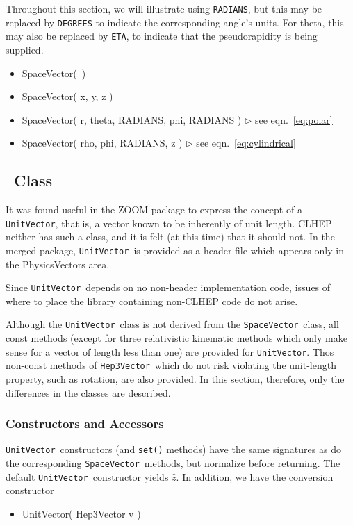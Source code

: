 \documentclass[twoside,12pt]{article}
\def \SV {{\tt Hep3Vector}}
\def \SVz {{\tt SpaceVector}}
\def \UV {{\tt UnitVector}}
\newcommand {\see}[1] {\hfill$\triangleright$ see eqn.~#1}
\newenvironment{shortlist}{%
\begin{itemize}
\setlength{\itemsep}{0pt}
\setlength{\parskip}{0pt}
}{%
\end{itemize}
}
\begin{document}
Throughout this section, we will illustrate using {\tt RADIANS}, 
but this may be replaced by {\tt DEGREES}
to indicate the corresponding angle's units.
For theta, this may also be replaced by {\tt ETA}, to indicate that the
pseudorapidity is being supplied.

\begin{shortlist}
  \item SpaceVector(~)
  \item SpaceVector( x, y, z ) 
  \item SpaceVector( r, theta, RADIANS, phi, RADIANS ) \see{\ref{eq:polar}}
  \item SpaceVector( rho, phi, RADIANS, z ) \see{\ref{eq:cylindrical}}
\end{shortlist}


\subsection{\protect\UV\ Class}

It was found useful in the ZOOM package to express the concept of a 
\UV, that is, a vector known to be inherently of unit length.
CLHEP neither has such a class, and it is felt (at this time) that
it should not.  
In the merged package, 
\UV\ is provided as a header file which appears only in the PhysicsVectors 
area.  

Since \UV\ depends on no non-header implementation code, issues of where
to place the library containing non-CLHEP code do not arise.

Although the \UV\ class is not derived from the \SVz\ class,
all const methods (except for three relativistic kinematic methods
which only make sense for a vector of length less than one) 
are provided for \UV .
Thos non-const methods of \SV\ which do not risk violating the unit-length 
property, such as rotation, are also provided.  
In this section, therefore,
only the differences in the classes are described.

\subsubsection{Constructors and Accessors}

\UV\ constructors (and \verb|set()| methods)
have the same signatures as do the corresponding \SVz\ methods,
but normalize before returning.
The default \UV\ constructor yields $\hat{z}$.
In addition, we have the conversion constructor
\begin{shortlist}
  \item UnitVector( Hep3Vector v )
\end{shortlist}
\end{document}
